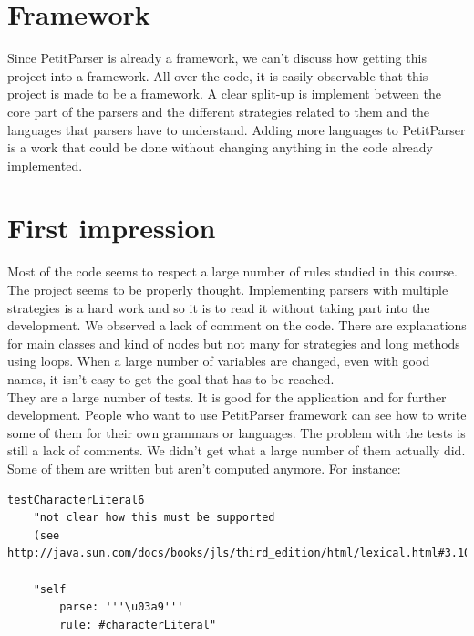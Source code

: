 \section{Framework}
Since PetitParser is already a framework, we can't discuss how getting this project into a framework. All over the code, it is easily observable that this project is made to be a framework. A clear split-up is implement between the core part of the parsers and the different strategies related to them and the languages that parsers have to understand. Adding more languages to PetitParser is a work that could be done without changing anything in the code already implemented. \\

\section{First impression}
Most of the code seems to respect a large number of rules studied in this course. The project seems to be properly thought. Implementing parsers with multiple strategies is a hard work and so it is to read it without taking part into the development. We observed a lack of comment on the code. There are explanations for main classes and kind of nodes but not many for strategies and long methods using loops. When a large number of variables are changed, even with good names, it isn't easy to get the goal that has to be reached.\\
They are a large number of tests. It is good for the application and for further development. People who want to use PetitParser framework can see how to write some of them for their own grammars or languages. The problem with the tests is still a lack of comments. We didn't get what a large number of them actually did. Some of them are written but aren't computed anymore. For instance:
\begin{lstlisting}[breaklines]
testCharacterLiteral6
	"not clear how this must be supported
	(see http://java.sun.com/docs/books/jls/third_edition/html/lexical.html#3.10.6)"
	
	"self 
		parse: '''\u03a9'''
		rule: #characterLiteral"
\end{lstlisting}

 
